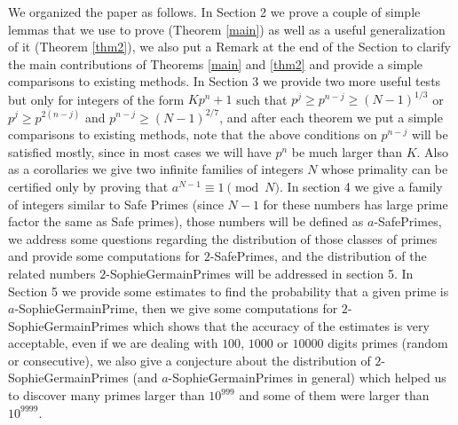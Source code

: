 \documentclass{amsart}
\numberwithin{equation}{section}
\begin{document}
We organized the paper as follows. In Section 2 we prove a couple of simple lemmas that we use to prove (Theorem \ref{main}) as well as a useful generalization of it (Theorem \ref{thm2}), we also put a Remark at the end of the Section to clarify the main contributions of Theorems \ref{main} and \ref{thm2} and provide a simple comparisons to existing methods. In Section 3 we provide two more useful tests but only for integers of the form $Kp^n+1$ such that  $p^j \ge p^{n-j} \ge (N-1)^{1/3}$ or $p^j \ge p^{2(n-j)} $ and $p^{n-j} \ge (N-1)^{2/7}$, and after each theorem we put a simple comparisons to existing methods, note that the above conditions on $p^{n-j}$ will be satisfied mostly, since in most cases we will have $p^n$ be much larger than $K$. Also as a corollaries we give two infinite families of integers $N$ whose primality can be certified only by proving that $a^{N-1} \equiv 1 \pmod N$. In section 4 we give a family of integers similar to Safe Primes (since $N-1$ for these numbers has large prime factor the same as Safe primes), those numbers will be defined as $a$-SafePrimes, we address some questions regarding the distribution of those classes of primes and provide some computations for $2$-SafePrimes, and the distribution of the related numbers $2$-SophieGermainPrimes will be addressed in section 5.
In Section 5 we provide some estimates to find the probability that a given prime is $a$-SophieGermainPrime, then we give some computations for $2$-SophieGermainPrimes  which shows that the accuracy of the estimates is very acceptable, even if we are dealing with $100$, $1000$ or $10000$ digits primes (random or consecutive), we also give a conjecture about the distribution of $2$-SophieGermainPrimes (and $a$-SophieGermainPrimes in general) which helped us to discover many primes larger than $10^{999}$ and some of them were larger than $10^{9999}$. 


\end{document}

